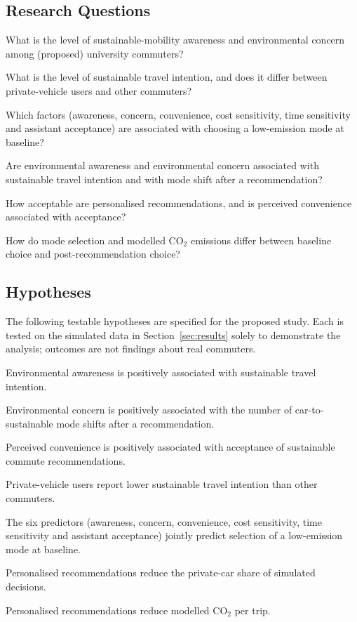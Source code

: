 \documentclass[11pt,a4paper]{article}
\begin{document}
\subsection{Research Questions}
\begin{description}[leftmargin=*,style=nextline]
\item[RQ1] What is the level of sustainable-mobility awareness and environmental concern among
(proposed) university commuters?
\item[RQ2] What is the level of sustainable travel intention, and does it differ between
private-vehicle users and other commuters?
\item[RQ3] Which factors (awareness, concern, convenience, cost sensitivity, time sensitivity and
assistant acceptance) are associated with choosing a low-emission mode at baseline?
\item[RQ4] Are environmental awareness and environmental concern associated with sustainable travel
intention and with mode shift after a recommendation?
\item[RQ5] How acceptable are personalised recommendations, and is perceived convenience associated
with acceptance?
\item[RQ6] How do mode selection and modelled CO$_2$ emissions differ between baseline choice and
post-recommendation choice?
\end{description}

\subsection{Hypotheses}
The following testable hypotheses are specified for the proposed study. Each is tested on the
simulated data in Section~\ref{sec:results} solely to demonstrate the analysis; outcomes are not
findings about real commuters.
\begin{description}[leftmargin=*,style=nextline]
\item[H1] Environmental awareness is positively associated with sustainable travel intention.
\item[H2] Environmental concern is positively associated with the number of car-to-sustainable mode
shifts after a recommendation.
\item[H3] Perceived convenience is positively associated with acceptance of sustainable commute
recommendations.
\item[H4] Private-vehicle users report lower sustainable travel intention than other commuters.
\item[H5] The six predictors (awareness, concern, convenience, cost sensitivity, time sensitivity and
assistant acceptance) jointly predict selection of a low-emission mode at baseline.
\item[H6a] Personalised recommendations reduce the private-car share of simulated decisions.
\item[H6b] Personalised recommendations reduce modelled CO$_2$ per trip.
\end{description}
\end{document}
